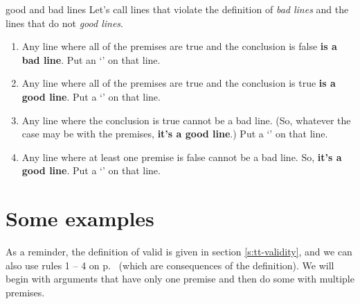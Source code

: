 \begin{factboxy}{good and bad lines}\label{s:tt-good-lines}
Let's call lines that violate the definition of  \textit{bad lines} and the lines that do not \textit{good lines}.
	\begin{enumerate}
		\item[(1)] Any line where all of the premises are true and the conclusion is false \textbf{is a bad line}. Put an `\xm' on that line.
		\item[(2)] Any line where all of the premises are true and the conclusion is true \textbf{is a good line}. Put a `\cm' on that line.
		\item[(3)] Any line where the conclusion is true cannot be a bad line. (So, whatever the case may be with the premises, \textbf{it's a good line}.) Put a `\cm' on that line.
		\item[(4)] Any line where at least one premise is false cannot be a bad line. So, \textbf{it's a good line}. Put a `\cm' on that line.
	\end{enumerate}
\end{factboxy}


\section{Some examples}

As a reminder, the definition of valid is given in section \ref{s:tt-validity}, and we can also use rules 1 -- 4 on p.~\pageref{s:tt-good-lines} (which are consequences of the definition). We will begin with arguments that have only one premise and then do some with multiple premises.

